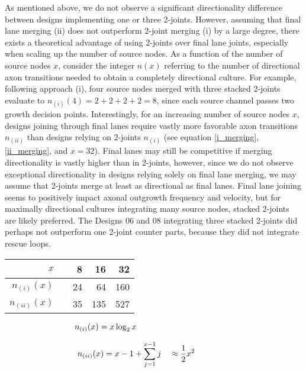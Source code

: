 As mentioned above, we do not observe a significant directionality difference
between designs implementing one or three 2-joints. However, assuming that final
lane merging (ii) does not outperform 2-joint merging (i) by a large degree,
there exists a theoretical advantage of using 2-joints over final lane joints,
especially when scaling up the number of source nodes. As a function of the
number of source nodes $x$, consider the integer $n(x)$ referring to the number
of directional axon transitions needed to obtain a completely directional
culture. For example, following approach (i), four source nodes merged with
three stacked 2-joints evaluate to $n_{(i)}(4) = 2 + 2 + 2 + 2 = 8$, since each
source channel passes two growth decision points. Interestingly, for an
increasing number of source nodes $x$, designs joining through final lanes
require vastly more favorable axon transitions $n_{(ii)}$ than designs relying
on 2-joints $n_{(i)}$ (see equation \ref{i_merging}, \ref{ii_merging}, and
$x=32$). Final lanes may still be competitive if merging directionality is
vastly higher than in 2-joints, however, since we do not observe exceptional
directionality in designs relying solely on final lane merging, we may assume
that 2-joints merge at least as directional as final lanes. Final lane joining
seems to positively impact axonal outgrowth frequency and velocity, but for
maximally directional cultures integrating many source nodes, stacked 2-joints
are likely preferred. The Designs 06 and 08 integrating three stacked 2-joints
did perhaps not outperform one 2-joint counter parts, because they did not
integrate rescue loops. \\

\vspace{5mm}
\hspace{1cm}
\begin{minipage}{0.3\textwidth}
    \hspace{5cm}
    \begin{tabular}{@{}rrrrr@{}}
        \toprule
        $x$ && 8 & 16 & 32 \\
        \midrule
        \vspace{2mm}
        $n_{(i)}(x)$ && 24 & 64 & 160 \\
        $n_{(ii)}(x)$ && 35 & 135 & 527 \\
    \end{tabular}
\end{minipage}%
\hfill
\begin{minipage}{0.6\textwidth}
    \begin{equation}
        n_{(i)}(x) = x \log_2{x} \hspace{4.1cm}
        \label{i_merging}
    \end{equation}

    \begin{equation}
        n_{(ii)}(x) = x-1 + \sum_{j=1}^{x-1} j \quad \approx \frac{1}{2}x^2 \hspace{1.5cm}
        \label{ii_merging}
    \end{equation}
\end{minipage}%
\vspace{5mm}

